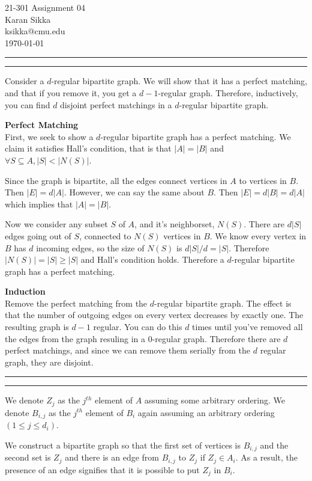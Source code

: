 \documentclass[11pt,letterpaper]{article}
\makeatletter
\newcommand{\question}[1] {\vspace{.25in} \hrule\vspace{0.5em}
\noindent{\bf #1} \vspace{0.5em}
\hrule \vspace{.10in}}
\newcommand{\myname}{Karan Sikka}
\newcommand{\myandrew}{ksikka@cmu.edu}
\newcommand{\myhwnum}{04}
\makeatother
\begin{document}
\medskip

\thispagestyle{plain}
\begin{center}                  %
{\Large 21-301 Assignment \myhwnum} \\
\myname \\
\myandrew \\
\today
\end{center}


\question{1}
Consider a $d$-regular bipartite graph. We will show that it has a perfect matching, and that if you remove it, you get a $d-1$-regular graph. Therefore, inductively, you can find $d$ disjoint perfect matchings in a $d$-regular bipartite graph.

\textbf{Perfect Matching}\\
First, we seek to show a $d$-regular bipartite graph has a perfect matching.
We claim it satisfies Hall's condition, that is that $|A| = |B|$ and
$\forall S \subseteq A , |S| < |N(S)|$.

Since the graph is bipartite, all the edges connect vertices in $A$ to vertices in $B$.
Then $|E| = d|A|$. However, we can say the same about $B$.
Then $|E| = d|B| = d|A|$ which implies that $|A| = |B|$.

Now we consider any subset $S$ of $A$, and it's neighborset, $N(S)$.
There are $d|S|$ edges going out of $S$, connected to $N(S)$ vertices in $B$.
We know every vertex in $B$ has $d$ incoming edges, so the size of $N(S)$ is $d|S|/d = |S|$.
Therefore $|N(S)| = |S| \geq |S|$ and Hall's condition holds. Therefore a $d$-regular bipartite graph has a perfect matching.

\textbf{Induction}\\
Remove the perfect matching from the $d$-regular bipartite graph. The effect is that the number of outgoing edges on every vertex decreases by exactly one.
The resulting graph is $d-1$ regular. You can do this $d$ times until you've removed all the edges from the graph resuling in a 0-regular graph.
Therefore there are $d$ perfect matchings, and since we can remove them serially from the $d$ regular graph, they are disjoint.

\question{2}
We denote $Z_j$ as the $j^{th}$ element of $A$ assuming some arbitrary ordering.
We denote $B_{i,j}$ as the $j^{th}$ element of $B_i$ again assuming an arbitrary ordering $(1 \leq j \leq d_i)$.

We construct a bipartite graph so that the first set of vertices is
$B_{i,j}$
and the second set is
$Z_j$
and there is an edge from $B_{i,j}$ to $Z_j$ if $Z_j \in A_i$.
As a result, the presence of an edge signifies that it is possible to put $Z_j$ in $B_i$.
\end{document}

